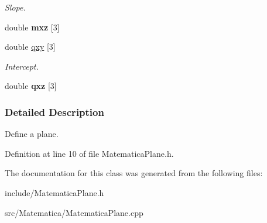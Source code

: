 \begin{DoxyCompactItemize}
\begin{DoxyCompactList}\small\item\em \-Slope. \end{DoxyCompactList}\item 
\hypertarget{classPiano_a1d227138d7d70c0c41daccf38c22dd56}{double {\bfseries mxz} \mbox{[}3\mbox{]}}\label{classPiano_a1d227138d7d70c0c41daccf38c22dd56}

\item 
\hypertarget{classPiano_adec87ca29093f1081bf0ce93a026c107}{double \hyperlink{classPiano_adec87ca29093f1081bf0ce93a026c107}{qxy} \mbox{[}3\mbox{]}}\label{classPiano_adec87ca29093f1081bf0ce93a026c107}

\begin{DoxyCompactList}\small\item\em \-Intercept. \end{DoxyCompactList}\item 
\hypertarget{classPiano_a5b42094ccf2602beb24464acdd28c0ac}{double {\bfseries qxz} \mbox{[}3\mbox{]}}\label{classPiano_a5b42094ccf2602beb24464acdd28c0ac}

\end{DoxyCompactItemize}


\subsubsection{\-Detailed \-Description}
\-Define a plane. 

\-Definition at line 10 of file \-Matematica\-Plane.\-h.



\-The documentation for this class was generated from the following files\-:\begin{DoxyCompactItemize}
\item 
include/\-Matematica\-Plane.\-h\item 
src/\-Matematica/\-Matematica\-Plane.\-cpp\end{DoxyCompactItemize}
